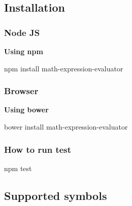 \subsection*{Installation}

\subsubsection*{Node JS}

{\bfseries Using npm}

npm install math-\/expression-\/evaluator

\subsubsection*{Browser}

{\bfseries Using bower}

bower install math-\/expression-\/evaluator

\subsubsection*{How to run test}

\begin{DoxyVerb}npm test
\end{DoxyVerb}


\subsection*{Supported symbols}

